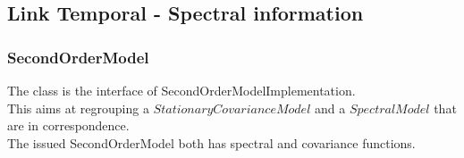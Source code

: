\newpage \subsection{Link Temporal - Spectral information}

 \subsubsection{SecondOrderModel}

The class is the interface of SecondOrderModelImplementation. \\
This aims at regrouping a $StationaryCovarianceModel$ and a $SpectralModel$ that are in correspondence.\\
The issued SecondOrderModel both has spectral and covariance functions. \\ \\

